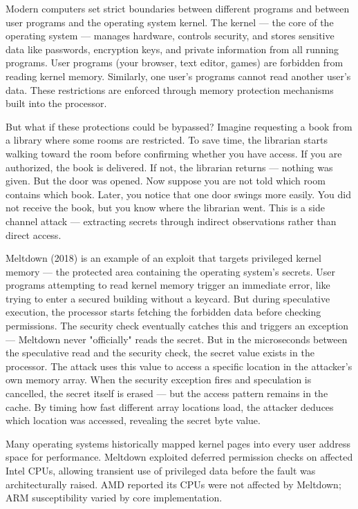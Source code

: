 Modern computers set strict boundaries between different programs and between user programs and the operating system kernel. The kernel — the core of the operating system — manages hardware, controls security, and stores sensitive data like passwords, encryption keys, and private information from all running programs. User programs (your browser, text editor, games) are forbidden from reading kernel memory. Similarly, one user's programs cannot read another user's data. These restrictions are enforced through memory protection mechanisms built into the processor.

But what if these protections could be bypassed? Imagine requesting a book from a library where some rooms are restricted. To save time, the librarian starts walking toward the room before confirming whether you have access. If you are authorized, the book is delivered. If not, the librarian returns — nothing was given. But the door was opened. Now suppose you are not told which room contains which book. Later, you notice that one door swings more easily. You did not receive the book, but you know where the librarian went. This is a side channel attack — extracting secrets through indirect observations rather than direct access.

Meltdown (2018) is an example of an exploit that targets privileged kernel memory — the protected area containing the operating system's secrets. User programs attempting to read kernel memory trigger an immediate error, like trying to enter a secured building without a keycard. But during speculative execution, the processor starts fetching the forbidden data before checking permissions. The security check eventually catches this and triggers an exception — Meltdown never "officially" reads the secret. But in the microseconds between the speculative read and the security check, the secret value exists in the processor. The attack uses this value to access a specific location in the attacker's own memory array. When the security exception fires and speculation is cancelled, the secret itself is erased — but the access pattern remains in the cache. By timing how fast different array locations load, the attacker deduces which location was accessed, revealing the secret byte value.

Many operating systems historically mapped kernel pages into every user address space for performance. Meltdown exploited deferred permission checks on affected Intel CPUs, allowing transient use of privileged data before the fault was architecturally raised. AMD reported its CPUs were not affected by Meltdown; ARM susceptibility varied by core implementation.

